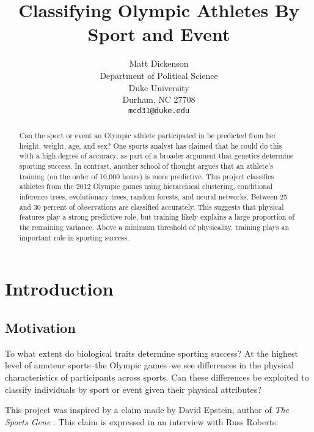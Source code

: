\documentclass[12pt,letterpaper]{article} %
\title{Classifying Olympic Athletes By Sport and Event}
\author{
Matt Dickenson\\
Department of Political Science\\
Duke University\\
Durham, NC 27708 \\
\texttt{mcd31@duke.edu}
}
\begin{document}
\begin{titlepage}

\clearpage
\maketitle
\thispagestyle{empty}

\begin{abstract}
Can the sport or event an Olympic athlete participated in be predicted from her height, weight, age, and sex? One sports analyst has claimed that he could do this with a high degree of accuracy, as part of a broader argument that genetics determine sporting success. In contrast, another school of thought argues that an athlete's training (on the order of 10,000 hours) is more predictive. This project classifies athletes from the 2012 Olympic games using hierarchical clustering, conditional inference trees, evolutionary trees, random forests, and neural networks. Between 25 and 30 percent of observations are classified accurately. This suggests that physical features play a strong predictive role, but training likely explains a large proportion of the remaining variance. Above a minimum threshold of physicality, training plays an important role in sporting success.
\end{abstract}

\end{titlepage}



\newpage

\section{Introduction}

\subsection{Motivation}

To what extent do biological traits determine sporting success? At the highest level of amateur sports--the Olympic games--we see differences in the physical characteristics of participants across sports. Can these differences be exploited to classify individuals by sport or event given their physical attributes? 

This project was inspired by a claim made by David Epstein, author of \textit{The Sports Gene} \citep{epstein2013sports}. This claim is expressed in an interview with Russ Roberts:
\end{document}
